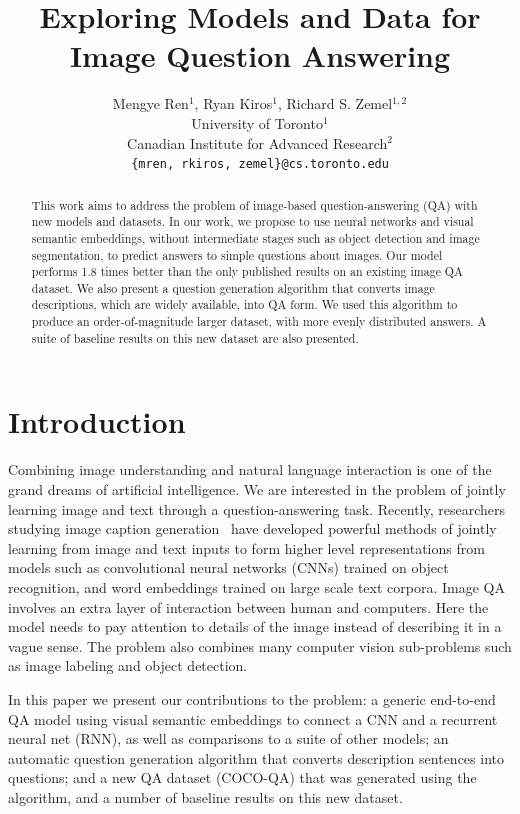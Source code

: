 \documentclass{article} %
\title{Exploring Models and Data for Image Question Answering}
\author{
Mengye Ren${}^1$, Ryan Kiros${}^1$, Richard S. Zemel${}^{1, 2}$\\
University of Toronto${}^1$\\
Canadian Institute for Advanced Research${}^2$\\
\texttt{\{mren, rkiros, zemel\}@cs.toronto.edu} \\
}
\renewcommand{\#}[1]{\textbf{#1}}
\begin{document}
\maketitle

\begin{abstract}

This work aims to address the problem of image-based question-answering (QA)
with new models and datasets. In our work, we propose to use neural networks
and visual semantic embeddings, without intermediate stages such as object
detection and image segmentation, to predict answers to simple questions about
images. Our model performs 1.8 times better than the only published results on
an existing image QA dataset. We also present a question generation algorithm
that converts image descriptions, which are widely available, into QA form. We
used this algorithm to produce an order-of-magnitude larger dataset, with more
evenly distributed answers. A suite of baseline results on this new dataset are
also presented.

\end{abstract}

\section{Introduction}

Combining image understanding and natural language interaction is one of the
grand dreams of artificial intelligence. We are interested in the problem of
jointly learning image and text through a question-answering task. Recently,
researchers studying image caption generation~\cite{vinyals14,kiros14b,
karpathy14,mao14,donahue14,chen14,fang14,xu15,lebret15,klein15} have developed
powerful methods of jointly learning from image and text inputs to form higher
level representations from models such as convolutional neural networks (CNNs)
trained on object recognition, and word embeddings trained on large scale text
corpora. Image QA involves an extra layer of interaction between human and
computers. Here the model needs to pay attention to details of the image
instead of describing it in a vague sense. The problem also combines many
computer vision sub-problems such as image labeling and object detection.

In this paper we present our contributions to the problem: a generic end-to-end
QA model using visual semantic embeddings to connect a CNN and a recurrent
neural net (RNN), as well as comparisons to a suite of other models; an
automatic question generation algorithm that converts description sentences
into questions; and a new QA dataset (COCO-QA) that was generated using the
algorithm, and a number of baseline results on this new dataset.
\end{document}
